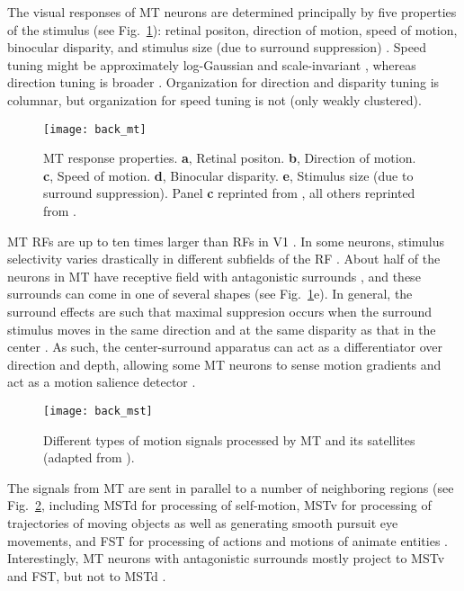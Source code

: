 The visual responses of \ac{MT} neurons are determined principally
by five properties of the stimulus (see Fig.~\ref{fig:BKG|MT|response}): 
retinal positon, direction of motion, speed of motion, binocular disparity, 
and stimulus size (due to surround suppression) \citep{BornBradley2005}.
Speed tuning might be approximately log-Gaussian and scale-invariant
\citep{Nover2005}, whereas direction tuning is broader
\citep{Duijnhouwer2013}.
Organization for direction and disparity tuning is columnar,
but organization for speed tuning is not (only weakly clustered).

\begin{figure}[t]
  \centering
  \texttt{[image: back\_mt]}
  \caption{
  \ac{MT} response properties.
  \textbf{a}, Retinal positon.
  \textbf{b}, Direction of motion.
  \textbf{c}, Speed of motion.
  \textbf{d}, Binocular disparity.
  \textbf{e}, Stimulus size (due to surround suppression).
  Panel \textbf{c} reprinted from \cite{Nover2005}, all others reprinted from
  \cite{BornBradley2005}.}
  \label{fig:BKG|MT|response}
\end{figure}

\ac{MT} \acp{RF} are up to ten times larger than \acp{RF} in \ac{V1}
\citep{Raiguel1995}.
In some neurons, stimulus selectivity varies drastically in different 
subfields of the \ac{RF} \citep{Richert2013}.
About half of the neurons in \ac{MT} have receptive field with
antagonistic surrounds \citep{Allman1985,Raiguel1995}, and these
surrounds can come in one of several shapes 
(see Fig.~\ref{fig:BKG|MT|response}e).
In general, the surround effects are such that maximal suppresion occurs
when the surround stimulus moves in the same direction and at the same
disparity as that in the center \citep{Allman1985}.
As such, the center-surround apparatus can act as a differentiator over
direction and depth, allowing some \ac{MT} neurons to sense motion gradients
and act as a motion salience detector \citep{BornBradley2005}.

\begin{figure}[t]
  \centering
  \texttt{[image: back\_mst]}
  \caption{
  Different types of motion signals processed by \ac{MT} and
  its satellites
  (adapted from \cite{Orban2008}).}
  \label{fig:BKG|MST|pathway}
\end{figure}

The signals from MT are sent in parallel to a number of neighboring regions
(see Fig.~\ref{fig:BKG|MST|pathway},
including \acf{MSTd} for processing of self-motion, 
\acf{MSTv} for processing of trajectories of moving objects as well as
generating smooth pursuit eye movements,
and \acf{FST} for processing of actions and motions of animate entities
\citep{Orban2008}.
Interestingly, \ac{MT} neurons with antagonistic surrounds mostly project
to \ac{MSTv} and \ac{FST}, but not to \ac{MSTd} \citep{BerezovskiiBorn2000}.


